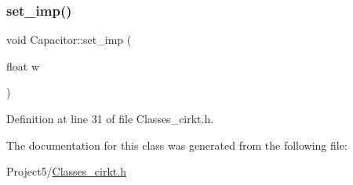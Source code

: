 \subsubsection{\texorpdfstring{set\+\_\+imp()}{set\_imp()}}
{\footnotesize\ttfamily void Capacitor\+::set\+\_\+imp (\begin{DoxyParamCaption}\item[{float}]{w }\end{DoxyParamCaption})}



Definition at line 31 of file Classes\+\_\+cirkt.\+h.



The documentation for this class was generated from the following file\+:\begin{DoxyCompactItemize}
\item 
Project5/\mbox{\hyperlink{_classes__cirkt_8h}{Classes\+\_\+cirkt.\+h}}\end{DoxyCompactItemize}
